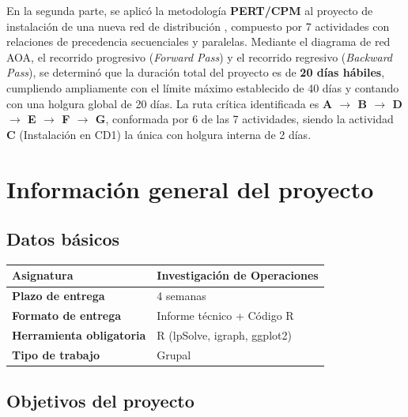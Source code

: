 \documentclass[12pt,a4paper]{article}
\begin{document}
En la segunda parte, se aplic\'{o} la metodolog\'{i}a \textbf{PERT/CPM} al proyecto de 
instalaci\'{o}n de una nueva red de distribuci\'{o}n \cite{render2012}, compuesto por 
7 actividades con relaciones de precedencia secuenciales y paralelas. Mediante el diagrama 
de red AOA, el recorrido progresivo (\textit{Forward Pass}) y el recorrido regresivo 
(\textit{Backward Pass}), se determin\'{o} que la duraci\'{o}n total del proyecto es de 
\textbf{20 d\'{i}as h\'{a}biles}, cumpliendo ampliamente con el l\'{i}mite m\'{a}ximo 
establecido de 40 d\'{i}as y contando con una holgura global de 20 d\'{i}as. La ruta 
cr\'{i}tica identificada es \textbf{A $\to$ B $\to$ D $\to$ E $\to$ F $\to$ G}, 
conformada por 6 de las 7 actividades, siendo la actividad \textbf{C} (Instalaci\'{o}n 
en CD1) la \'{u}nica con holgura interna de 2 d\'{i}as.


\newpage

\section{Informaci\'{o}n general del proyecto}

\subsection{Datos b\'{a}sicos}

\begin{table}[H]
  \centering
  \begin{tabular}{|l|l|}
    \hline
    \textbf{Asignatura}              & Investigaci\'{o}n de Operaciones \\
    \hline
    \textbf{Plazo de entrega}        & 4 semanas \\
    \hline
    \textbf{Formato de entrega}      & Informe t\'{e}cnico + C\'{o}digo R \\
    \hline
    \textbf{Herramienta obligatoria} & R (lpSolve, igraph, ggplot2) \\
    \hline
    \textbf{Tipo de trabajo}         & Grupal \\
    \hline
  \end{tabular}
\end{table}

\subsection{Objetivos del proyecto}
\end{document}

